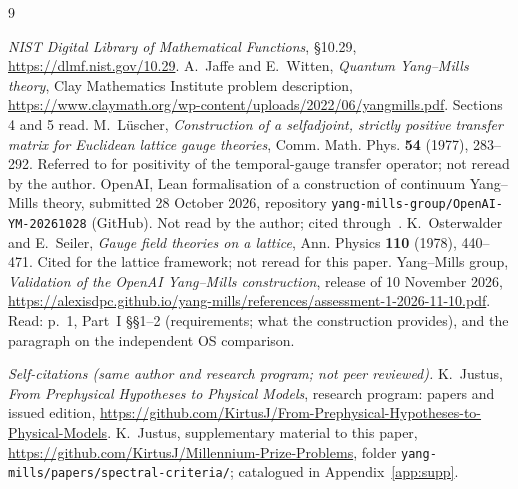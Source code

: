 \begin{thebibliography}{9}\raggedright
{} \emph{NIST Digital Library of Mathematical Functions}, \S10.29, \url{https://dlmf.nist.gov/10.29}.
 A.~Jaffe and E.~Witten, \emph{Quantum Yang--Mills theory}, Clay Mathematics Institute problem
description, \url{https://www.claymath.org/wp-content/uploads/2022/06/yangmills.pdf}. Sections 4 and 5 read.
 M.~L\"uscher, \emph{Construction of a selfadjoint, strictly positive transfer matrix for
Euclidean lattice gauge theories}, Comm. Math. Phys. \textbf{54} (1977), 283--292. Referred to for positivity
of the temporal-gauge transfer operator; not reread by the author.
 OpenAI, Lean formalisation of a construction of continuum Yang--Mills theory, submitted
28 October 2026, repository \texttt{yang-mills-group/OpenAI-YM-20261028} (GitHub). Not read by the author;
cited through~\cite{YMG}.
 K.~Osterwalder and E.~Seiler, \emph{Gauge field theories on a lattice}, Ann. Physics
\textbf{110} (1978), 440--471. Cited for the lattice framework; not reread for this paper.
 Yang--Mills group, \emph{Validation of the OpenAI Yang--Mills construction}, release of
10 November 2026, \url{https://alexisdpc.github.io/yang-mills/references/assessment-1-2026-11-10.pdf}. Read:
p.~1, Part~I \S\S1--2 (requirements; what the construction provides), and the paragraph on the independent
OS comparison.

\medskip
\item[] \emph{Self-citations (same author and research program; not peer reviewed).}
 K.~Justus, \emph{From Prephysical Hypotheses to Physical Models}, research program: papers and
issued edition, \url{https://github.com/KirtusJ/From-Prephysical-Hypotheses-to-Physical-Models}.
 K.~Justus, supplementary material to this paper,
\url{https://github.com/KirtusJ/Millennium-Prize-Problems}, folder
\texttt{yang-mills/papers/spectral-criteria/}; catalogued in Appendix~\ref{app:supp}.
\end{thebibliography}

